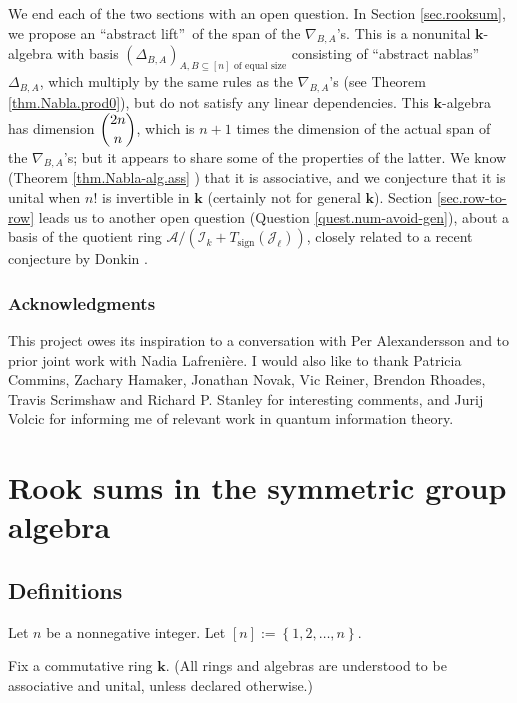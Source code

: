\documentclass[numbers=enddot,12pt,final,onecolumn,notitlepage]{scrartcl}%
\numberwithin{exer}{subsection}
\theoremstyle{definition}
\begin{document}
We end each of the two sections with an open question. In Section
\ref{sec.rooksum}, we propose an \textquotedblleft abstract
lift\textquotedblright\ of the span of the $\nabla_{B,A}$'s. This is a
nonunital $\mathbf{k}$-algebra with basis $\left(  \Delta_{B,A}\right)
_{A,B\subseteq\left[  n\right]  \text{ of equal size}}$ consisting of
\textquotedblleft abstract nablas\textquotedblright\ $\Delta_{B,A}$, which
multiply by the same rules as the $\nabla_{B,A}$'s (see Theorem
\ref{thm.Nabla.prod0}), but do not satisfy any linear dependencies. This
$\mathbf{k}$-algebra has dimension $\dbinom{2n}{n}$, which is $n+1$ times the
dimension of the actual span of the $\nabla_{B,A}$'s; but it appears to share
some of the properties of the latter. We know (Theorem \ref{thm.Nabla-alg.ass}%
) that it is associative, and we conjecture that it is unital when $n!$ is
invertible in $\mathbf{k}$ (certainly not for general $\mathbf{k}$). Section
\ref{sec.row-to-row} leads us to another open question (Question
\ref{quest.num-avoid-gen}), about a basis of the quotient ring $\mathcal{A}%
/\left(  \mathcal{I}_{k}+T_{\operatorname*{sign}}\left(  \mathcal{J}_{\ell
}\right)  \right)  $, closely related to a recent conjecture by Donkin
\cite[Remark 2.4]{Donkin24}.

\subsubsection*{Acknowledgments}

This project owes its inspiration to a conversation with Per Alexandersson and
to prior joint work with Nadia Lafreni\`{e}re. I would also like to thank
Patricia Commins, Zachary Hamaker, Jonathan Novak, Vic Reiner, Brendon
Rhoades, Travis Scrimshaw and Richard P. Stanley for interesting comments, and
Jurij Volcic for informing me of relevant work in quantum information theory.

\section{\label{sec.rooksum}Rook sums in the symmetric group algebra}

\subsection{Definitions}

Let $n$ be a nonnegative integer. Let $\left[  n\right]  :=\left\{
1,2,\ldots,n\right\}  $.

Fix a commutative ring $\mathbf{k}$. (All rings and algebras are understood to
be associative and unital, unless declared otherwise.)
\end{document}
